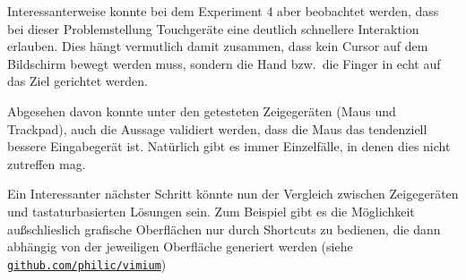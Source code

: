 \documentclass{article}
\begin{document}
Interessanterweise konnte bei dem Experiment 4 aber beobachtet werden, dass bei
dieser Problemstellung Touchgeräte eine deutlich schnellere Interaktion erlauben.
Dies hängt vermutlich damit zusammen, dass kein Cursor auf dem Bildschirm bewegt
werden muss, sondern die Hand bzw.\ die Finger in echt auf das Ziel gerichtet
werden.

Abgesehen davon konnte unter den getesteten Zeigegeräten (Maus und Trackpad),
auch die Aussage validiert werden, dass die Maus das tendenziell bessere
Eingabegerät ist. Natürlich gibt es immer Einzelfälle, in denen dies nicht
zutreffen mag.

Ein Interessanter nächster Schritt könnte nun der Vergleich zwischen
Zeigegeräten und tastaturbasierten Lösungen sein. Zum Beispiel gibt es die
Möglichkeit außschlieslich grafische Oberflächen nur durch Shortcuts zu bedienen,
die dann abhängig von der jeweiligen Oberfläche generiert werden (siehe
\href{https://github.com/philc/vimium}{\texttt{github.com/philic/vimium}})
\end{document}

